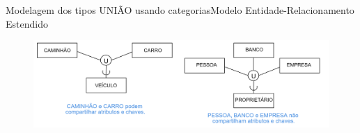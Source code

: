 \documentclass[t]{beamer}
\begin{document}

\begin{ftst}{Modelagem dos tipos UNIÃO usando categorias}{Modelo Entidade-Relacionamento Estendido}
\vone
\begin{figure}
    \centering
    \includegraphics[scale=0.12]{Figuras/02_06.png}
\end{figure}

\end{ftst}
\end{document}
